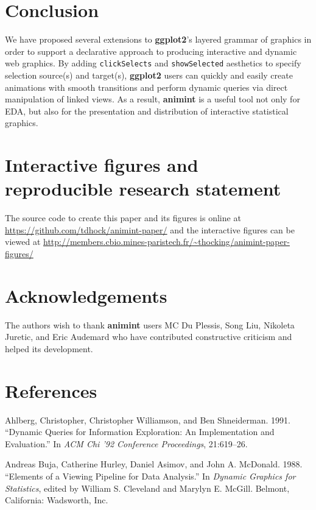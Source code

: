 \documentclass[12pt,]{article}
\theoremstyle{definition}
\theoremstyle{definition}
\theoremstyle{definition}
\theoremstyle{remark}
\begin{document}
\hypertarget{conclusion}{%
\section{Conclusion}\label{conclusion}}

We have proposed several extensions to \textbf{ggplot2}'s layered
grammar of graphics in order to support a declarative approach to
producing interactive and dynamic web graphics. By adding
\texttt{clickSelects} and \texttt{showSelected} aesthetics to specify
selection source(s) and target(s), \textbf{ggplot2} users can quickly
and easily create animations with smooth transitions and perform dynamic
queries via direct manipulation of linked views. As a result,
\textbf{animint} is a useful tool not only for EDA, but also for the
presentation and distribution of interactive statistical graphics.

\section*{Interactive figures and reproducible research statement}

The source code to create this paper and its figures is online at
\url{https://github.com/tdhock/animint-paper/} and the interactive
figures can be viewed at
\url{http://members.cbio.mines-paristech.fr/~thocking/animint-paper-figures/}

\section*{Acknowledgements}

The authors wish to thank \textbf{animint} users MC Du Plessis, Song
Liu, Nikoleta Juretic, and Eric Audemard who have contributed
constructive criticism and helped its development.

\section*{References}

\hypertarget{refs}{}
\leavevmode\hypertarget{ref-Ahlberg:1991}{}%
Ahlberg, Christopher, Christopher Williamson, and Ben Shneiderman. 1991.
``Dynamic Queries for Information Exploration: An Implementation and
Evaluation.'' In \emph{ACM Chi '92 Conference Proceedings}, 21:619--26.

\leavevmode\hypertarget{ref-viewing-pipeline}{}%
Andreas Buja, Catherine Hurley, Daniel Asimov, and John A. McDonald.
1988. ``Elements of a Viewing Pipeline for Data Analysis.'' In
\emph{Dynamic Graphics for Statistics}, edited by William S. Cleveland
and Marylyn E. McGill. Belmont, California: Wadsworth, Inc.
\end{document}
